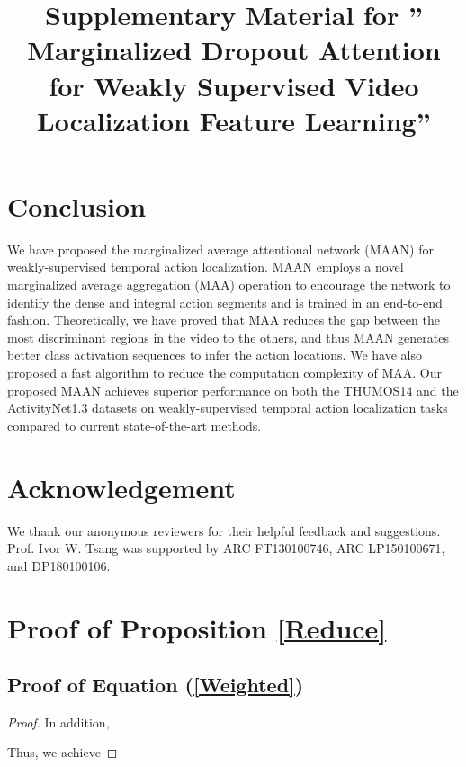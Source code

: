 \documentclass{article} \usepackage{iclr2019_conference,times}
\begin{document}
\section{Conclusion}





We have proposed the marginalized average attentional network (MAAN) for weakly-supervised temporal action localization. MAAN employs a novel marginalized average aggregation (MAA) operation to encourage the network to identify the dense and integral action segments and is trained in an end-to-end fashion. Theoretically, we have proved that MAA reduces the gap between the most discriminant regions in the video to the others, and thus MAAN generates better class activation sequences to infer the action locations. We have also proposed a fast algorithm to reduce the computation complexity of MAA. 
Our proposed MAAN achieves superior performance on both the THUMOS14 and the ActivityNet1.3 datasets on weakly-supervised temporal action localization tasks compared to current state-of-the-art methods.





\section{Acknowledgement}
We thank our anonymous reviewers for their helpful feedback and suggestions. Prof. Ivor W. Tsang was supported by ARC FT130100746, ARC LP150100671, and DP180100106. 






\newpage

\newpage
\onecolumn


\title{Supplementary Material for  '' Marginalized Dropout Attention for Weakly Supervised Video Localization Feature Learning''}

\appendix


\section{Proof of Proposition \ref{Reduce}}\label{proof_reduce}
\subsection{Proof of Equation (\ref{Weighted})}
\begin{proof}

In addition, 

Thus, we achieve  




\end{proof}
\end{document}
